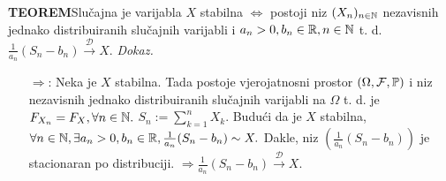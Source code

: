 \documentclass{article}
\begin{document}
\textbf{TEOREM}\newline Slučajna je varijabla \(X\) stabilna \(\Leftrightarrow\) postoji niz \((X_n)_{n\in\Bbb N}\) nezavisnih jednako distribuiranih slučajnih varijabli i \(a_n>0,b_n\in\Bbb R,n\in\Bbb N\) t. d. \(\frac1{a_n}(S_n-b_n)\overset{\mathcal D}{\longrightarrow}X.\)\newline\newline
\textit{Dokaz.}
\begin{enumerate}
    \item[\(\boxed{\Rightarrow}\):] Neka je \(X\) stabilna. Tada postoje vjerojatnosni prostor \((\Omega,\mathcal F,\Bbb P)\) i niz nezavisnih jednako distribuiranih slučajnih varijabli na \(\Omega\) t. d. je \(F_{X_n}=F_X,\forall n\in\Bbb N.\) \(S_n:=\sum_{k=1}^nX_k.\) Budući da je \(X\) stabilna, \(\forall n\in\Bbb N,\exists a_n>0,b_n\in\Bbb R,\frac1{a_n}(S_n-b_n)\sim X.\) Dakle, niz \(\left(\frac1{a_n}(S_n-b_n)\right)\) je stacionaran po distribuciji. \(\Rightarrow\frac1{a_n}(S_n-b_n)\overset{\mathcal D}{\longrightarrow}X.\)

\end{enumerate}
\end{document}

